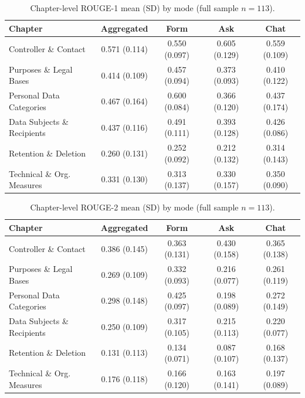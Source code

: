 \begin{table}[H]
\centering
\small
\setlength{\tabcolsep}{4pt}
\begin{tabular}{@{}l c c c c@{}}
\toprule
Chapter & Aggregated & Form & Ask & Chat \\
\midrule
Controller \& Contact         & 0.571 (0.114) & 0.550 (0.097) & 0.605 (0.129) & 0.559 (0.109) \\
Purposes \& Legal Bases       & 0.414 (0.109) & 0.457 (0.094) & 0.373 (0.093) & 0.410 (0.122) \\
Personal Data Categories      & 0.467 (0.164) & 0.600 (0.084) & 0.366 (0.120) & 0.437 (0.174) \\
Data Subjects \& Recipients   & 0.437 (0.116) & 0.491 (0.111) & 0.393 (0.128) & 0.426 (0.086) \\
Retention \& Deletion         & 0.260 (0.131) & 0.252 (0.092) & 0.212 (0.132) & 0.314 (0.143) \\
Technical \& Org. Measures    & 0.331 (0.130) & 0.313 (0.137) & 0.330 (0.157) & 0.350 (0.090) \\
\bottomrule
\end{tabular}
\caption{Chapter-level ROUGE-1 mean (SD) by mode (full sample
$n = 113$).}
\label{tab:nlp-chapter-rouge1}
\end{table}

\begin{table}[H]
\centering
\small
\setlength{\tabcolsep}{4pt}
\begin{tabular}{@{}l c c c c@{}}
\toprule
Chapter & Aggregated & Form & Ask & Chat \\
\midrule
Controller \& Contact         & 0.386 (0.145) & 0.363 (0.131) & 0.430 (0.158) & 0.365 (0.138) \\
Purposes \& Legal Bases       & 0.269 (0.109) & 0.332 (0.093) & 0.216 (0.077) & 0.261 (0.119) \\
Personal Data Categories      & 0.298 (0.148) & 0.425 (0.097) & 0.198 (0.089) & 0.272 (0.149) \\
Data Subjects \& Recipients   & 0.250 (0.109) & 0.317 (0.105) & 0.215 (0.113) & 0.220 (0.077) \\
Retention \& Deletion         & 0.131 (0.113) & 0.134 (0.071) & 0.087 (0.107) & 0.168 (0.137) \\
Technical \& Org. Measures    & 0.176 (0.118) & 0.166 (0.120) & 0.163 (0.141) & 0.197 (0.089) \\
\bottomrule
\end{tabular}
\caption{Chapter-level ROUGE-2 mean (SD) by mode (full sample
$n = 113$).}
\label{tab:nlp-chapter-rouge2}
\end{table}

